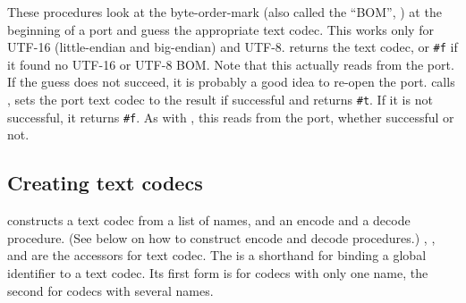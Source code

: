 \begin{protos}
\end{protos}
%
These procedures look at the byte-order-mark (also called the
``BOM'', ) at the
beginning of a port and guess the appropriate text codec.  This works
only for UTF-16 (little-endian and big-endian) and UTF-8.
 returns the text codec,
or \texttt{\#f} if it found no UTF-16 or UTF-8 BOM.  Note that this
actually reads from the port.  If the guess does not succeed, it is
probably a good idea to re-open the port.
 calls
, sets the port text
codec to the result if successful and returns \texttt{\#t}.  If it is
not successful, it returns \texttt{\#f}.  As with
, this reads from the
port, whether successful or not.

\subsection{Creating text codecs}

\begin{protos}
\end{protos}
%
 constructs a text codec from a list of names,
and an encode and a decode procedure.  (See below on how to construct
encode and decode procedures.)  ,
, and
 are the accessors for text codec.
The  is a shorthand for binding a global
identifier to a text codec.  Its first form is for codecs with only
one name, the second for codecs with several names.

